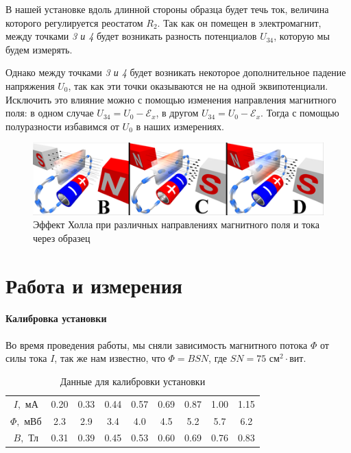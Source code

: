 \documentclass[a4paper, 12pt]{article}
\begin{document}
В нашей установке вдоль длинной стороны образца будет течь ток, величина которого регулируется реостатом $R_2$. Так как он помещен в электромагнит, между точками \textit{3 и 4} будет возникать разность потенциалов $U_{34}$, которую мы будем измерять. 

Однако между точками \textit{3 и 4} будет возникать некоторое дополнительное падение напряжения $U_{0}$, так как эти точки оказываются не на одной эквипотенциали. Исключить это влияние можно с помощью изменения направления магнитного поля: в одном случае $U_{34} = U_{0} - \mathscr{E}_x $, в другом  $U_{34} = U_0 - \mathscr{E}_x $. Тогда с помощью полуразности избавимся от $U_{0}$ в наших измерениях. 

\begin{figure}[H]
	\begin{center}
		\includegraphics[width = 0.6 \textwidth]{Hall_dif}
		\caption{Эффект Холла при различных направлениях магнитного поля и тока через образец}
	\end{center}
\end{figure}

\section{Работа и измерения}

\paragraph{Калибровка установки}
Во время проведения работы, мы сняли зависимость магнитного потока $\varPhi$ от силы тока $I$, так же нам известно, что $\varPhi=BSN$, где $SN=75\text{ см}^2\cdot\text{вит}$.
\begin{table}[H]
\centering
\caption{Данные для калибровки установки}
\begin{tabular}{c|c c c c c c c c}
\toprule
$I, \text{ мА}$ & 0.20    & 0.33   & 0.44 & 0.57   & 0.69   & 0.87 & 1.00     & 1.15   \\
$\varPhi, \text{ мВб}$ & 2.3 & 2.9 & 3.4 & 4.0 & 4.5 & 5.2 & 5.7 & 6.2  \\ \midrule
$B, \text{ Тл}$ & 0.31 & 0.39 & 0.45 & 0.53 & 0.60 & 0.69 & 0.76 & 0.83 \\ \bottomrule
\end{tabular}
\label{calibrate}
\end{table}
\end{document}
